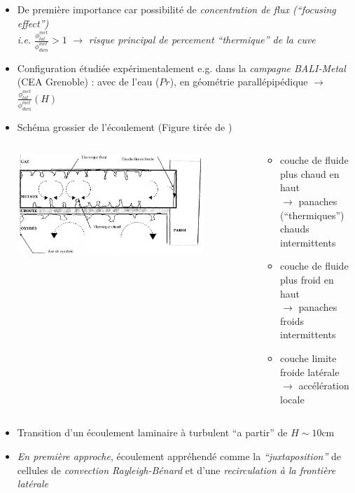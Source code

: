 \begin{frame}[fragile]
\begin{itemize}
\item De première importance car possibilité de \emph{concentration de flux (``focusing effect'')} \\ \textit{i.e.} $\frac{\phi^{met}_{lat}}{\phi^{met}_{dwn}}>1$ $\rightarrow$ \emph{risque principal de percement ``thermique'' de la cuve}
\item Configuration étudiée expérimentalement e.g. dans la \emph{campagne BALI-Metal} (CEA Grenoble) : avec de l'eau (\danger $Pr$), en géométrie parallépipédique $\rightarrow$ $\frac{\phi^{met}_{lat}}{\phi^{met}_{dwn}}\left(H\right)$
\item Schéma grossier de l'écoulement (Figure tirée de \cite{Villermaux1999})
\begin{columns}[T]
    \begin{column}{0.6\textwidth}
\centering \includegraphics[width=0.8\textwidth]{Figures/metal_layer_flow.png}
    \end{column}
    \begin{column}{0.5\textwidth}
    \hskip -1cm \begin{minipage}{\textwidth}
    \begin{itemize}
    \item couche de fluide plus chaud en haut\\ $\rightarrow$ panaches (``thermiques'') chauds intermittents
    \item couche de fluide plus froid en haut \\ $\rightarrow$ panaches froids intermittents
    \item couche limite froide latérale \\ $\rightarrow$ accélération locale
    \end{itemize}
    \end{minipage}
    \end{column}
\end{columns}
\item Transition d'un écoulement laminaire à turbulent ``a partir'' de $H \sim10$cm
\item \emph{En première approche}, écoulement appréhendé comme la \emph{``juxtaposition''} de cellules de \emph{convection Rayleigh-Bénard} et d'une \emph{recirculation à la frontière latérale}
\end{itemize}
\end{frame}
